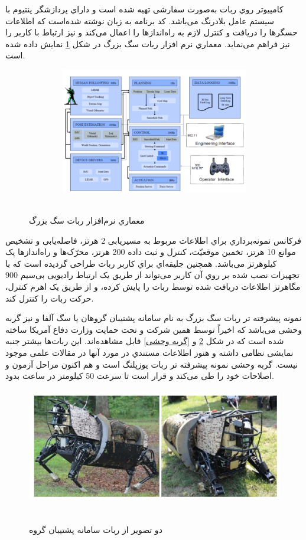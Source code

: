 \begin{itemize}
کامپیوتر روي ربات به‌صورت سفارشی تهیه شده است و داراي پردازشگر پنتیوم با سیستم عامل بلادرنگ
 می‌باشد. کد برنامه به زبان
 نوشته شده‌است که اطلاعات حسگرها را دریافت و کنترل لازم به راه‌اندازها را اعمال می‌کند و نیز ارتباط با کاربر را نیز فراهم می‌نماید. معماري نرم افزار ربات سگ بزرگ در شكل
\ref{معماری سگ بزرگ}
نمایش داده شده است.
    \begin{figure}[!h]
 	\vspace{0.2cm}
 	\centering
 	\includegraphics[height=5.5cm,width=13cm]{./Images/CH1/big_dog_structure.png}
 	‌\caption{معماري نرم‌افزار ربات سگ بزرگ}
 	\label{معماری سگ بزرگ}
 	\end{figure}
 
فرکانس نمونه‌برداري براي اطلاعات مربوط به مسیریابی 2 هرتز، فاصله‌یابی و تشخیص موانع 10 هرتز، تخمین موقعیّت، کنترل و ثبت داده 200 هرتز، محرّک‌ها و راه‌اندازها یک کیلوهرتز می‌باشد. همچنین جلیقه‌اي براي کاربر ربات طراحی گردیده است که با تجهیزات نصب شده بر روي آن کاربر می‌تواند از طریق یک ارتباط رادیویی بی‌سیم 900 مگاهرتز اطلاعات دریافت شده توسط ربات را پایش کرده، و از طریق یک اهرم کنترل، حرکت ربات را کنترل کند.

نمونه پیشرفته تر ربات سگ بزرگ به‌ نام سامانه پشتیبان گروهان
\unskip{}
 یا سگ آلفا و نیز گربه وحشی
\unskip{}
 می‌باشد که اخیراً توسط همین شرکت و تحت حمایت وزارت دفاع آمریكا ساخته شده است که در شكل
\ref{ربات پشتیبان گروه}
و
\ref{گربه وحشی}
قابل مشاهده‌اند\cite{LS3}\cite{Wild-Cat}. این ربات‌ها بیشتر جنبه نمایشی نظامی داشته و هنوز اطلاعات مستندي در مورد آنها در مقالات علمی موجود نیست. گربه وحشی نمونه پیشرفته تر ربات یوزپلنگ
است و هم اکنون مراحل آزمون و اصلاحات خود را طی می‌کند و قرار است تا سرعت   50 کیلومتر در ساعت بدود.
    \begin{figure}[!h]
	\vspace{0.2cm}
	\centering
	\includegraphics[height=5cm,width=13cm]{./Images/CH1/LS3_robot.png}
	‌\caption[دو تصویر از ربات سامانه پشتیبان گروه]{دو تصویر از ربات سامانه پشتیبان گروه\cite{LS3}}
	\label{ربات پشتیبان گروه}
	\end{figure}


\end{itemize}
